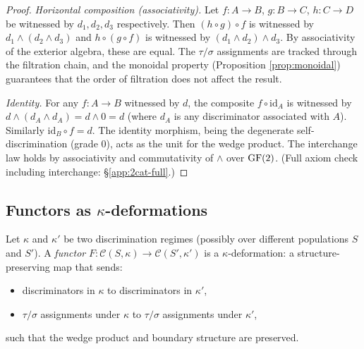 \begin{proof}
\emph{Horizontal composition (associativity).}
Let $f: A \to B$, $g: B \to C$, $h: C \to D$ be witnessed
by $d_1, d_2, d_3$ respectively. Then
$(h \circ g) \circ f$ is witnessed by
$d_1 \wedge (d_2 \wedge d_3)$ and
$h \circ (g \circ f)$ is witnessed by
$(d_1 \wedge d_2) \wedge d_3$. By associativity of the
exterior algebra, these are equal. The $\tau/\sigma$
assignments are tracked through the filtration chain,
and the monoidal property (Proposition \ref{prop:monoidal})
guarantees that the order of filtration does not affect
the result.

\emph{Identity.}
For any $f: A \to B$ witnessed by $d$, the composite
$f \circ \mathrm{id}_A$ is witnessed by $d \wedge (d_A \wedge d_A)
= d \wedge 0 = d$ (where $d_A$ is any discriminator
associated with $A$). Similarly $\mathrm{id}_B \circ f = d$.
The identity morphism, being the degenerate self-discrimination
(grade 0), acts as the unit for the wedge product.
The interchange law holds by associativity and
commutativity of $\wedge$ over $\operatorname{GF}(2)$.
(Full axiom check including interchange: \S\ref{app:2cat-full}.)
\end{proof}

\subsection{Functors as $\kappa$-deformations}\label{sec:functors}

\begin{definition}[Functor]\label{def:functor}
Let $\kappa$ and $\kappa'$ be two discrimination regimes
(possibly over different populations $S$ and $S'$). A
\emph{functor} $F: \mathcal{C}(S,\kappa) \to
\mathcal{C}(S',\kappa')$ is a $\kappa$-deformation: a
structure-preserving map that sends:
\begin{itemize}[nosep]
  \item discriminators in $\kappa$ to discriminators in
    $\kappa'$,
  \item $\tau/\sigma$ assignments under $\kappa$ to
    $\tau/\sigma$ assignments under $\kappa'$,
\end{itemize}
such that the wedge product and boundary structure are
preserved.
\end{definition}

